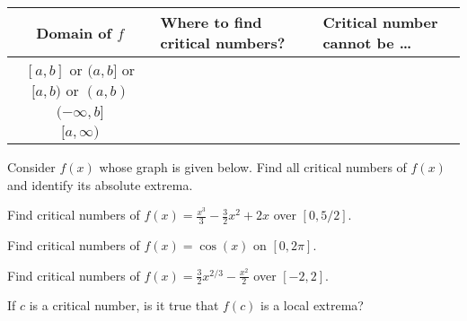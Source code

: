 \documentclass[../main.tex]{subfiles}
\begin{document}
  \begin{center}
    \begin{tabular}{c|l|l}
      Domain of \(f\) & Where to find critical numbers? & Critical number cannot be \ldots{} \\\midrule
      \([a,b]\) or \((a,b]\) or \([a,b)\) or \((a,b)\) & & \\[1ex]\midrule
      \((-\infty, b]\) & & \\[1ex]\midrule
      \([a, \infty)\) & & \\[1ex]\midrule
    \end{tabular}
  \end{center}
  
  \begin{example} \label{ex:critical-numbers}
    Consider \(f(x)\) whose graph is given below. Find all critical numbers of \(f(x)\) and identify its absolute extrema.

    \begin{center}
      
    \end{center}
  \end{example}
  \clearpage

  \begin{example} \label{ex:critical-number-polynomial}
    Find critical numbers of \(f(x) = \frac{x^{3}}{3} - \frac{3}{2}x^{2} + 2x\) over \([0, 5/2]\).
  \end{example}

  \begin{example} \label{ex:critical-number-trig}
    Find critical numbers of \(f(x) = \cos(x)\) on \([0, 2\pi]\).

  \end{example}

  \begin{example} \label{ex:critical-number-rational}
    Find critical numbers of \(f(x) = \frac{3}{2} x^{2/3} - \frac{x^{2}}{2}\) over \([-2,2]\). 

  \end{example}
  \clearpage

  \begin{example} \label{ex:critical-number-is-candidate}
    If \(c\) is a critical number, is it true that \(f(c)\) is a local extrema?

    \begin{center}
      
      \hfill
      
      \hfill
      
      \hfill
      
    \end{center}
  \end{example}
\end{document}
